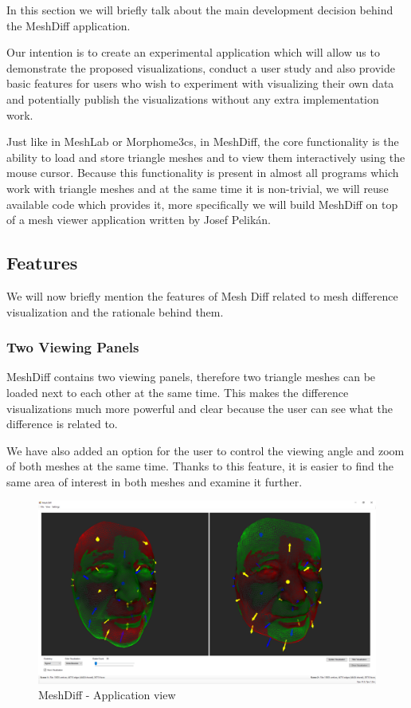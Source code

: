 In this section we will briefly talk about the main development decision behind the MeshDiff application.

Our intention is to create an experimental application which will allow us to demonstrate the proposed visualizations, conduct a user study and also provide basic features for users who wish to experiment with visualizing their own data and potentially publish the visualizations without any extra implementation work.

Just like in MeshLab or Morphome3cs, in MeshDiff, the core functionality is the ability to load and store triangle meshes and to view them interactively using the mouse cursor. Because this functionality is present in almost all programs which work with triangle meshes and at the same time it is non-trivial, we will reuse available code which provides it, more specifically we will build MeshDiff on top of a mesh viewer application written by Josef Pelikán.

\subsection{Features}
\label{sec:meshdiff_features}

We will now briefly mention the features of Mesh Diff related to mesh difference visualization and the rationale behind them.

\subsubsection{Two Viewing Panels}

MeshDiff contains two viewing panels, therefore two triangle meshes can be loaded next to each other at the same time. This makes the difference visualizations much more powerful and clear because the user can see what the difference is related to.

We have also added an option for the user to control the viewing angle and zoom of both meshes at the same time. Thanks to this feature, it is easier to find the same area of interest in both meshes and examine it further.

\begin{figure}[h]
\centering
\includegraphics[width=\textwidth]{./img/meshdiff.PNG}
\caption{MeshDiff - Application view}
\label{fig:meshdiff}
\end{figure}

